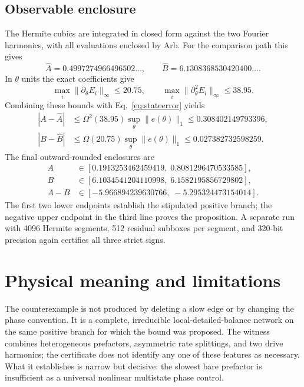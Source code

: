\documentclass[11pt]{article}
\newcommand{\norm}[1]{\lVert#1\rVert}
\begin{document}
\subsection{Observable enclosure}

The Hermite cubics are integrated in closed form against the two Fourier harmonics,
with all evaluations enclosed by Arb.  For the comparison path this gives
\begin{equation}
 \widehat A=0.4997274966496502\ldots,\qquad
 \widehat B=6.1308368530420400\ldots .
\end{equation}
In \(\theta\) units the exact coefficients give
\begin{equation}
 \max_i\norm{\partial_\theta E_i}_\infty\leq20.75,
 \qquad
 \max_i\norm{\partial_\theta^2 E_i}_\infty\leq38.95.
\end{equation}
Combining these bounds with Eq.~\eqref{eq:stateerror} yields
\begin{align}
 |A-\widehat A|&\leq\Omega^2(38.95)\sup_\theta\norm{e(\theta)}_1
 \leq0.308402149793396,\\
 |B-\widehat B|&\leq\Omega(20.75)\sup_\theta\norm{e(\theta)}_1
 \leq0.027382732598259.
\end{align}
The final outward-rounded enclosures are
\begin{align}
 A&\in[0.1913253462459419,\;0.8081296470533585],\\
 B&\in[6.1034541204110998,\;6.1582195856729802],\\
 A-B&\in[-5.966894239630766,\;-5.295324473154014].
 \label{eq:finalintervals}
\end{align}
The first two lower endpoints establish the stipulated positive branch; the negative
upper endpoint in the third line proves the proposition.  A separate run with 4096
Hermite segments, 512 residual subboxes per segment, and 320-bit precision again
certifies all three strict signs.

\section{Physical meaning and limitations}

The counterexample is not produced by deleting a slow edge or by changing the phase
convention.  It is a complete, irreducible local-detailed-balance network on the same
positive branch for which the bound was proposed.  The witness combines heterogeneous
prefactors, asymmetric rate splittings, and two drive harmonics; the certificate does
not identify any one of these features as necessary.  What it establishes is narrow
but decisive: the slowest bare prefactor is insufficient as a universal nonlinear
multistate phase control.
\end{document}
